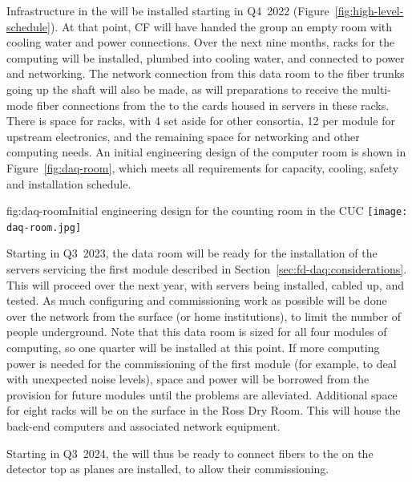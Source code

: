 
Infrastructure in the  will be installed starting in Q4~2022
(Figure~\ref{fig:high-level-schedule}).  At that point, CF will have
handed the  group an empty room with cooling water and power
connections.  Over the next nine months, racks for the  computing
will be installed, plumbed into cooling water, and connected to power
and networking.  The network connection from this data room to the fiber
trunks going up the shaft will also be made, as will preparations to
receive the multi-mode fiber connections from the  to the
 cards housed in servers in these racks. There is space
for \cucracks racks, with 4 set aside for other consortia, 12 per
module for upstream  electronics, and the remaining space for
networking and other  computing needs. An initial engineering design of the computer room is shown in Figure~\ref{fig:daq-room}, which meets all requirements for capacity, cooling, safety and installation schedule.

\begin{dunefigure}{fig:daq-room}{Initial engineering design for the  counting room in the CUC}
  \texttt{[image: daq-room.jpg]}
\end{dunefigure}

Starting in Q3~2023, the data room will be ready for the installation of
the  servers servicing the first module described in
Section~\ref{sec:fd-daq:considerations}.  This will proceed over the
next year, with servers being installed, cabled up, and tested.
As much configuring and commissioning work as possible will be done over
the network from the surface (or home institutions), to limit the number
of people underground.  Note that this data room is sized for all four
modules of  computing, so one quarter will be installed at this
point.  If more computing power is needed for the commissioning of the
first module (for example, to deal with unexpected noise levels), space
and power will be borrowed from the provision for future modules until the problems are
alleviated. 
Additional space for eight racks will be on the surface in the Ross Dry
Room. This will house the back-end computers and associated network equipment.

Starting in Q3~2024, the  will thus be ready to connect fibers to the
 on the detector top as planes are installed, to allow their commissioning.

